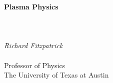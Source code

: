 \documentclass[12pt]{rfbook}
\begin{document}
\thispagestyle{empty}
\begin{center}
{\Huge\bf Plasma Physics}\\[1ex]
~\\
~\\
~\\
{\Large\em  Richard Fitzpatrick}\\[1.5ex]~\\[1.5ex]
{\Large\sf  Professor  of Physics}\\[1.5ex]
{\Large\sf  The University of Texas at Austin}
\end{center}

\pagestyle{fancy}
\renewcommand{\chaptermark}[1]{\markboth{#1}{}}
\fancyhf{}
\fancyhead[LO,RE]{\sl \leftmark}
\fancyhead[LE,RO]{\sl \thepage}

\tableofcontents







\end{document}
